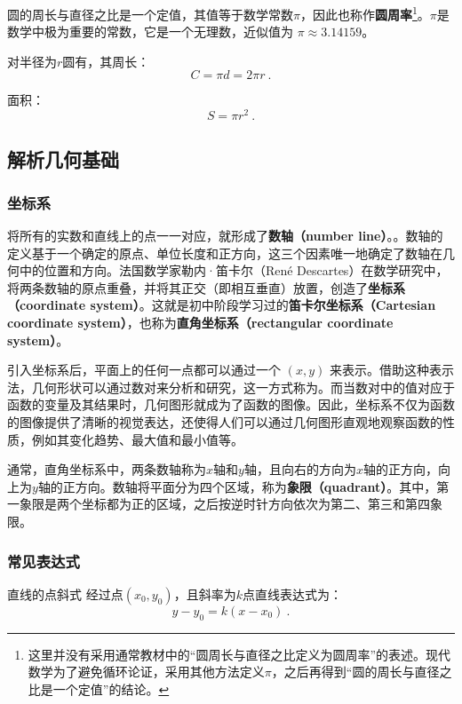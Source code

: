 圆的周长与直径之比是一个定值，其值等于数学常数$\pi$，因此也称作\textbf{圆周率}\footnote{这里并没有采用通常教材中的“圆周长与直径之比定义为圆周率”的表述。现代数学为了避免循环论证，采用其他方法定义$\pi$，之后再得到“圆的周长与直径之比是一个定值”的结论。}。$\pi$是数学中极为重要的常数，它是一个无理数，近似值为 $\pi \approx 3.14159$。

对半径为$r$圆有，其周长：
\begin{equation}
C = \pi d=2 \pi r~. 
\end{equation}

面积：
\begin{equation}
S = \pi r^2~.
\end{equation}


\subsection{解析几何基础}

\subsubsection{坐标系}
将所有的实数和直线上的点一一对应，就形成了\textbf{数轴（number line）}。。数轴的定义基于一个确定的原点、单位长度和正方向，这三个因素唯一地确定了数轴在几何中的位置和方向。法国数学家勒内·笛卡尔（René Descartes）在数学研究中，将两条数轴的原点重叠，并将其正交（即相互垂直）放置，创造了\textbf{坐标系（coordinate system）}。这就是初中阶段学习过的\textbf{笛卡尔坐标系（Cartesian coordinate system）}，也称为\textbf{直角坐标系（rectangular coordinate system）}。

引入坐标系后，平面上的任何一点都可以通过一个 $(x, y)$ 来表示。借助这种表示法，几何形状可以通过数对来分析和研究，这一方式称为。而当数对中的值对应于函数的变量及其结果时，几何图形就成为了函数的图像。因此，坐标系不仅为函数的图像提供了清晰的视觉表达，还使得人们可以通过几何图形直观地观察函数的性质，例如其变化趋势、最大值和最小值等。

通常，直角坐标系中，两条数轴称为$x$轴和$y$轴，且向右的方向为$x$轴的正方向，向上为$y$轴的正方向。数轴将平面分为四个区域，称为\textbf{象限（quadrant）}。其中，第一象限是两个坐标都为正的区域，之后按逆时针方向依次为第二、第三和第四象限。

\subsubsection{常见表达式}

\begin{definition}{直线的点斜式}\label{def_HsGeBa_1}
经过点$(x_0,y_0)$，且斜率为$k$点直线表达式为：
\begin{equation}
y-y_0=k(x-x_0)~.
\end{equation}
\end{definition}

